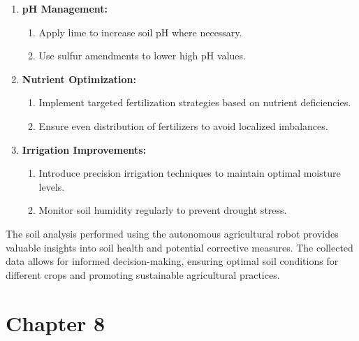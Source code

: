 \documentclass{book} %
\begin{document}
\begin{enumerate}
\item  \textbf{pH Management:}

\begin{enumerate}
\item  Apply lime to increase soil pH where necessary.

\item  Use sulfur amendments to lower high pH values.
\end{enumerate}

\item  \textbf{Nutrient Optimization:}

\begin{enumerate}
\item  Implement targeted fertilization strategies based on nutrient deficiencies.

\item  Ensure even distribution of fertilizers to avoid localized imbalances.
\end{enumerate}

\item  \textbf{Irrigation Improvements:}

\begin{enumerate}
\item  Introduce precision irrigation techniques to maintain optimal moisture levels.

\item  Monitor soil humidity regularly to prevent drought stress.
\end{enumerate}
\end{enumerate}

\noindent \textbf{}

\noindent The soil analysis performed using the autonomous agricultural robot provides valuable insights into soil health and potential corrective measures. The collected data allows for informed decision-making, ensuring optimal soil conditions for different crops and promoting sustainable agricultural practices.

\noindent 

\noindent 

\noindent 
\chapter{\eject }

\noindent 
\chapter{Chapter 8}
\end{document}
